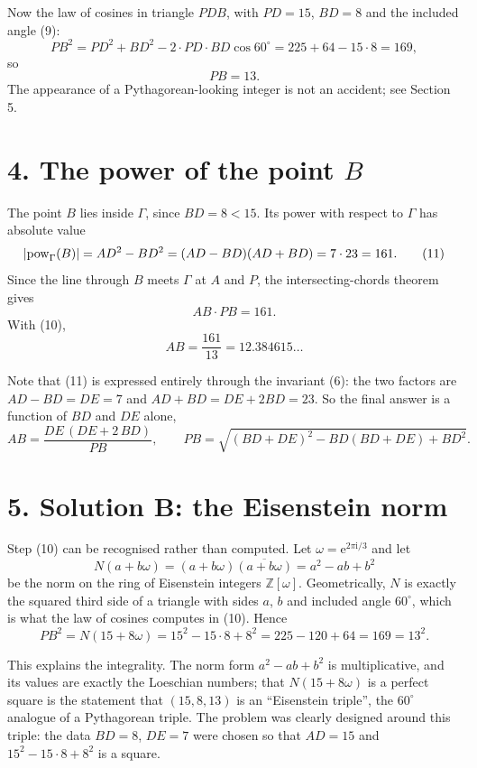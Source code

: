 \documentclass[12pt]{article}
\newcommand{\ii}{\mathrm{i}}
\newcommand{\e}{\mathrm{e}}
\newcommand{\ang}{^\circ}
\newcommand{\Gam}{\Gamma}
\begin{document}
Now the law of cosines in triangle \(PDB\), with \(PD=15\), \(BD=8\) and
the included angle (9):
\[
PB^2=PD^2+BD^2-2\cdot PD\cdot BD\cos60\ang
=225+64-15\cdot8=169,
\]
so
\[
\boxed{\displaystyle PB=13 .}
\tag{10}
\]
The appearance of a Pythagorean-looking integer is not an accident; see
Section 5.

\section*{4. The power of the point \(B\)}

The point \(B\) lies inside \(\Gam\), since \(BD=8<15\). Its power with
respect to \(\Gam\) has absolute value
\[
|{\rm pow}_\Gam(B)|=AD^2-BD^2=(AD-BD)(AD+BD)=7\cdot23=161 .
\tag{11}
\]
Since the line through \(B\) meets \(\Gam\) at \(A\) and \(P\), the
intersecting-chords theorem gives
\[
AB\cdot PB=161 .
\]
With (10),
\[
AB=\frac{161}{13}=12.384615\ldots
\]

Note that (11) is expressed entirely through the invariant (6): the two
factors are \(AD-BD=DE=7\) and \(AD+BD=DE+2BD=23\). So the final answer
is a function of \(BD\) and \(DE\) alone,
\[
\boxed{\displaystyle
AB=\frac{DE\,(DE+2\,BD)}{PB},
\qquad
PB=\sqrt{(BD+DE)^2-BD(BD+DE)+BD^2}. }
\]

\section*{5. Solution B: the Eisenstein norm}

Step (10) can be recognised rather than computed. Let
\(\omega=\e^{2\pi\ii/3}\) and let
\[
N(a+b\omega)=(a+b\omega)\overline{(a+b\omega)}=a^2-ab+b^2
\]
be the norm on the ring of Eisenstein integers \(\mathbb Z[\omega]\).
Geometrically, \(N\) is exactly the squared third side of a triangle with
sides \(a\), \(b\) and included angle \(60\ang\), which is what the law
of cosines computes in (10). Hence
\[
PB^2=N(15+8\omega)=15^2-15\cdot8+8^2=225-120+64=169=13^2 .
\]

This explains the integrality. The norm form \(a^2-ab+b^2\) is
multiplicative, and its values are exactly the Loeschian numbers; that
\(N(15+8\omega)\) is a perfect square is the statement that
\((15,8,13)\) is an ``Eisenstein triple'', the \(60\ang\) analogue of a
Pythagorean triple. The problem was clearly designed around this triple:
the data \(BD=8\), \(DE=7\) were chosen so that \(AD=15\) and
\(15^2-15\cdot8+8^2\) is a square.
\end{document}

